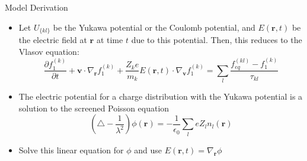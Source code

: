\documentclass{beamer}
\begin{document}
			\begin{frame}{Model Derivation}
			\begin{itemize}
	\item Let $U_{\{kl\}}$ be the Yukawa potential or the Coulomb potential, and $E(\mathbf{r},t)$ be the electric field at $\mathbf{r}$ at time $t$ due to this potential. Then, this reduces to the Vlasov equation:
			\begin{equation*}
			\frac{\partial f_1^{(k)}}{\partial t}+\mathbf{v}\cdot\nabla_\mathbf{r}f_1^{(k)}+\frac{Z_k e}{m_k}E(\mathbf{r},t)\cdot\nabla_\mathbf{v} f_1^{(k)}=\sum_l\frac{f_{eq}^{(kl)}-f_1^{(k)}}{\tau_{kl}}
			\end{equation*}
			\item The electric potential for a charge distribution with the Yukawa potential is a solution to the screened Poisson equation
			\[\left(\bigtriangleup-\frac{1}{\lambda^2}\right)\phi(\mathbf{r}) = -\frac{1}{\epsilon_0}\sum_l eZ_l n_l(\mathbf{r})
			\]
			\item Solve this linear equation for $\phi$ and use $E(\mathbf{r},t)=\nabla_\mathbf{r}\phi$
\end{itemize}
	\end{frame}
	
\end{document}
